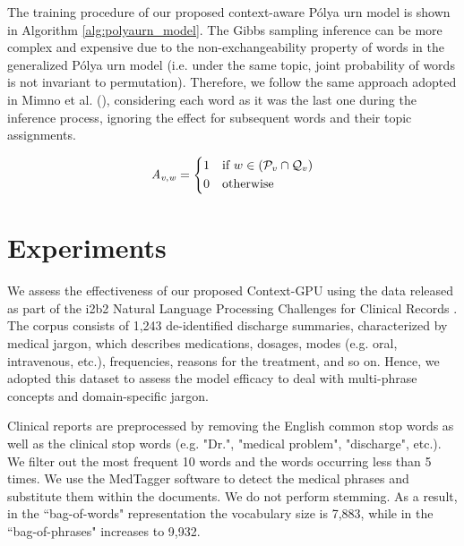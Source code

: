 \documentclass[letterpaper]{article}
\begin{document}
The training procedure of our proposed context-aware P\'{o}lya urn model is shown in Algorithm \ref{alg:polyaurn_model}. %
The Gibbs sampling inference can be more complex and expensive due to the non-exchangeability property of words in the generalized P\'{o}lya urn model (i.e. under the same topic, joint probability of words is not invariant to permutation). Therefore, we follow the same approach adopted in Mimno et al. (\citeyear{Mimno11}), considering each word as it was the last one during the inference process, ignoring the effect for subsequent words and their topic assignments.

\begin{equation}
\mathit{A_{v,w}}=
\begin{dcases}
1 & \text{if  }  w \in (\mathcal{P}_{v} \cap \mathcal{Q}_{v})  \\
0               & \text{otherwise}
\end{dcases}
\label{eq:matrixA}
\end{equation}







\section{Experiments}

We assess the effectiveness of our proposed Context-GPU using the data released as part of the i2b2 Natural Language Processing Challenges for Clinical Records \cite{Uzuner10}. The corpus consists of 1,243 de-identified discharge summaries, characterized by medical jargon, which describes medications, dosages, modes (e.g. oral, intravenous, etc.), frequencies, reasons for the treatment, and so on. Hence, we adopted this dataset to assess the model efficacy to deal with multi-phrase concepts and domain-specific jargon.

Clinical reports are preprocessed by removing the English common stop words as well as the clinical stop words (e.g. "Dr.", "medical problem", "discharge", etc.). We filter out the most frequent 10 words and the words occurring less than 5 times. We use the MedTagger software to detect the medical phrases and substitute them within the documents. We do not perform stemming. As a result, in the ``bag-of-words" representation the vocabulary size is 7,883, while in the ``bag-of-phrases" increases to 9,932.
\end{document}

